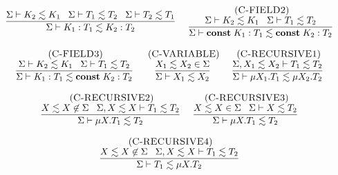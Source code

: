 \begin{figure}[!ht]
\begin{footnotesize}
$$\begin{array}{c}
\begin{array}{c}
\dfrac{\senv \vdash K_{2} \lesssim K_{1} \;\;\;
       \senv \vdash T_{1} \lesssim T_{2} \;\;\;
       \senv \vdash T_{2} \lesssim T_{1}}
      {\senv \vdash K_{1}:T_{1} \lesssim K_{2}:T_{2}}
\end{array}
\;
\begin{array}{c}
\mylabel{C-FIELD2}\\
\dfrac{\senv \vdash K_{2} \lesssim K_{1} \;\;\;
       \senv \vdash T_{1} \lesssim T_{2}}
      {\senv \vdash \Const \; K_{1}:T_{1} \lesssim \Const \; K_{2}:T_{2}}
\end{array}
\\ \\
\begin{array}{c}
\mylabel{C-FIELD3}\\
\dfrac{\senv \vdash K_{2} \lesssim K_{1} \;\;\;
       \senv \vdash T_{1} \lesssim T_{2}}
      {\senv \vdash K_{1}:T_{1} \lesssim \Const \; K_{2}:T_{2}}
\end{array}
\;
\begin{array}{c}
\mylabel{C-VARIABLE}\\
\dfrac{X_{1} \lesssim X_{2} \in \senv}
      {\senv \vdash X_{1} \lesssim X_{2}}
\end{array}
\;
\begin{array}{c}
\mylabel{C-RECURSIVE1}\\
\dfrac{\senv, X_{1} \lesssim X_{2} \vdash T_{1} \lesssim T_{2}}
      {\senv \vdash \mu X_{1}.T_{1} \lesssim \mu X_{2}.T_{2}}
\end{array}
\\ \\
\begin{array}{c}
\mylabel{C-RECURSIVE2}\\
\dfrac{X \lesssim X \not\in \senv \;\;\;
      \senv, X \lesssim X \vdash T_{1} \lesssim T_{2}}
      {\senv \vdash \mu X.T_{1} \lesssim T_{2}}
\end{array}
\;
\begin{array}{c}
\mylabel{C-RECURSIVE3}\\
\dfrac{X \lesssim X \in \senv \;\;\;
       \senv \vdash X \lesssim T_{2}}
      {\senv \vdash \mu X.T_{1} \lesssim T_{2}}
\end{array}
\\ \\
\begin{array}{c}
\mylabel{C-RECURSIVE4}\\
\dfrac{X \lesssim X \not\in \senv \;\;\;
       \senv, X \lesssim X \vdash T_{1} \lesssim T_{2}}
      {\senv \vdash T_{1} \lesssim \mu X.T_{2}}

\end{array}
\end{array}$$
\end{footnotesize}
\end{figure}
